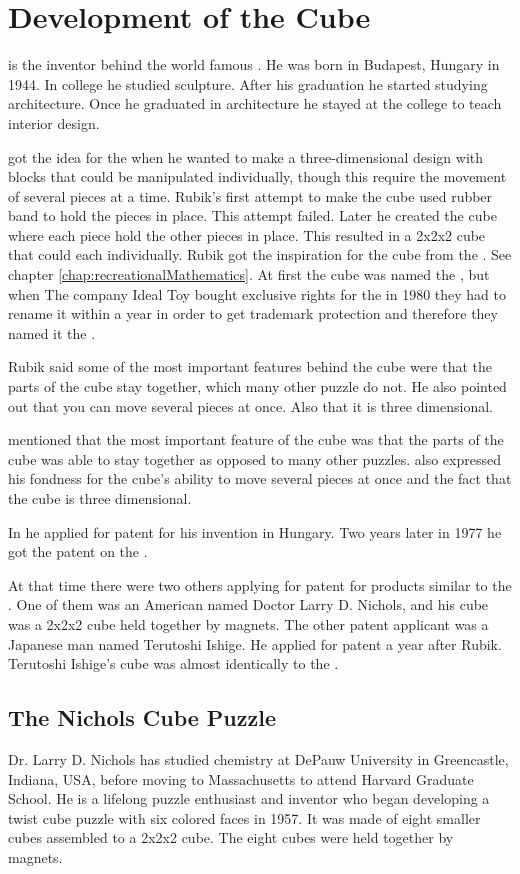 \chapter{Development of the Cube}
 is the inventor behind the world famous \rubik{}. He was born in Budapest, Hungary in 1944.  In college he studied sculpture. After his graduation he started studying architecture. Once he graduated in architecture he stayed at the college to teach interior design.

 got the idea for the \cube{} when he wanted to make a three-dimensional design with blocks that could be manipulated individually, though this require the movement of several pieces at a time. Rubik's first attempt to make the cube used rubber band to hold the pieces in place. This attempt failed. Later he created the cube where each piece hold the other pieces in place. This resulted in a 2x2x2 cube that could \twist{} each \face{} individually. Rubik got the inspiration for the cube from the \mpuzzle{}. See chapter \ref{chap:recreationalMathematics}. At first the cube was named the \mcube{}, but when The company Ideal Toy bought exclusive rights for the \mcube{} in 1980 they had to rename it within a year in order to get trademark protection and therefore they named it the \rubik{}.

Rubik said some of the most important features behind the cube were that the parts of the cube stay together, which many other puzzle do not. He also pointed out that you can move several pieces at once. Also that it is three dimensional. 

\erno mentioned that the most important feature of the cube was that the parts of the cube was able to stay together as opposed to many other puzzles.  also expressed his fondness for the cube's ability to move several pieces at once and the fact that the cube is three dimensional.

In  he applied for patent for his invention in Hungary. Two years later in 1977 he got the patent on the \rubik{}.

At that time there were two others applying for patent for products similar to the \rubik{}.  One of them was an American named Doctor Larry D. Nichols, and his cube was a 2x2x2 cube held together by magnets. The other patent applicant was a Japanese man named Terutoshi Ishige. He applied for patent a year after Rubik. Terutoshi Ishige's cube was almost identically to the \rubik{}. 
 
\section{The Nichols Cube Puzzle}
Dr. Larry D. Nichols has studied chemistry at DePauw University in Greencastle, Indiana, USA, before moving to Massachusetts to attend Harvard Graduate School. 
He is a lifelong puzzle enthusiast and inventor who began developing a twist cube puzzle with six colored faces in 1957. It was made of eight smaller cubes assembled to a 2x2x2 cube. The eight cubes were held together by magnets.

